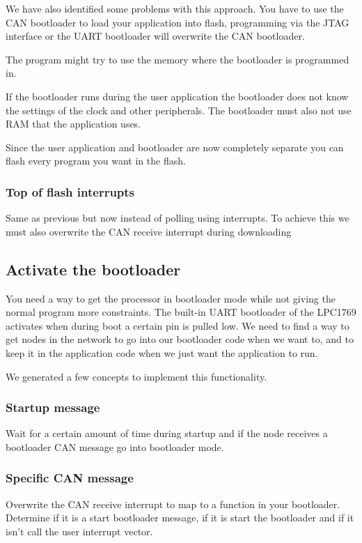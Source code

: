 \documentclass[twocolumn]{article}
\begin{document}
			We have also identified some problems with this approach.
			You have to use the CAN bootloader to load your application into flash,
			programming via the JTAG interface or the UART bootloader will overwrite the CAN bootloader.
			
			The program might try to use the memory where the bootloader is programmed in.
			
			If the bootloader runs during the user application the bootloader does not know the settings of the clock and other peripherals.
			The bootloader must also not use RAM that the application uses. 
			
			Since the user application and bootloader are now completely separate you can flash every program you want in the flash.
			
		\subsubsection*{Top of flash interrupts}
			Same as previous but now instead of polling using interrupts.
			To achieve this we must also overwrite the CAN receive interrupt during downloading
	
	\subsection*{Activate the bootloader}
		You need a way to get the processor in bootloader mode while not giving the normal program more constraints.
		The built-in UART bootloader of the LPC1769 activates when during boot a certain pin is pulled low.
		We need to find a way to get nodes in the network to go into our bootloader code when we want to,
		and to keep it in the application code when we just want the application to run.
		
		We generated a few concepts to implement this functionality.
		
		\subsubsection*{Startup message}
			Wait for a certain amount of time during startup and if the node receives a bootloader CAN message go into bootloader mode.
		
		\subsubsection*{Specific CAN message}
			Overwrite the CAN receive interrupt to map to a function in your bootloader.
			Determine if it is a start bootloader message,
			if it is start the bootloader and if it isn't call the user interrupt vector.
			
\end{document}
